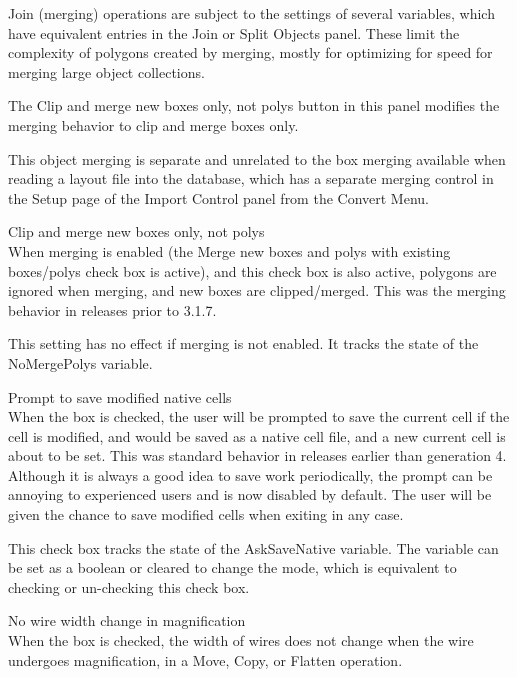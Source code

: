 \begin{description}
Join (merging) operations are subject to the settings of several
variables, which have equivalent entries in the {\cb Join or Split
Objects} panel.  These limit the complexity of polygons created by
merging, mostly for optimizing for speed for merging large object
collections.

The {\cb Clip and merge new boxes only, not polys} button in this
panel modifies the merging behavior to clip and merge boxes only.

This object merging is separate and unrelated to the box merging
available when reading a layout file into the database, which has a
separate merging control in the {\cb Setup} page of the {\cb Import
Control} panel from the {\cb Convert Menu}.

\item{\cb Clip and merge new boxes only, not polys}\\
When merging is enabled (the {\cb Merge new boxes and polys with
existing boxes/polys} check box is active), and this check box is also
active, polygons are ignored when merging, and new boxes are
clipped/merged.  This was the merging behavior in releases prior to
3.1.7.

This setting has no effect if merging is not enabled.  It tracks the
state of the {\et NoMergePolys} variable.

\item{\cb Prompt to save modified native cells}\\
When the box is checked, the user will be prompted to save the current
cell if the cell is modified, and would be saved as a native cell
file, and a new current cell is about to be set.  This was standard
behavior in releases earlier than generation 4.  Although it is always
a good idea to save work periodically, the prompt can be annoying to
experienced users and is now disabled by default.  The user will be
given the chance to save modified cells when exiting {\Xic} in any
case.

This check box tracks the state of the {\et AskSaveNative} variable. 
The variable can be set as a boolean or cleared to change the mode,
which is equivalent to checking or un-checking this check box.

\item{\cb No wire width change in magnification}\\
When the box is checked, the width of wires does not change when the
wire undergoes magnification, in a {\cb Move}, {\cb Copy}, or {\cb
Flatten} operation.


\end{description}
